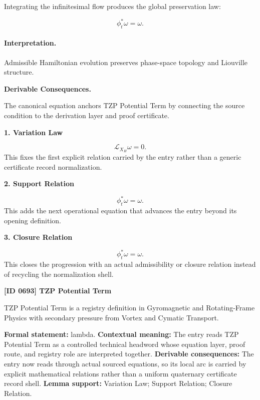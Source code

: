 Integrating the infinitesimal flow produces the global preservation law:

\begin{equation}
\boxed{
\phi_t^{*}\omega=\omega.
}
\end{equation}

\paragraph{Interpretation.}
Admissible Hamiltonian evolution preserves phase-space topology and Liouville structure.

\par\vspace{0.35em}
\noindent\textbf{Derivable Consequences.}\quad
\begingroup
\footnotesize
\raggedright
The canonical equation anchors TZP Potential Term by connecting the source condition to the derivation layer and proof certificate.
\par\endgroup

\noindent\textbf{1. Variation Law}\par
\[
\mathcal{L}_{X_H}\omega=0.
\]
\noindent This fixes the first explicit relation carried by the entry rather than a generic certificate record normalization.\par
\noindent\textbf{2. Support Relation}\par
\[
\phi_t^{*}\omega=\omega.
\]
\noindent This adds the next operational equation that advances the entry beyond its opening definition.\par
\noindent\textbf{3. Closure Relation}\par
\[
\boxed{ \phi_t^{*}\omega=\omega. }
\]
\noindent This closes the progression with an actual admissibility or closure relation instead of recycling the normalization shell.\par

\clearpage
\noindent\textbf{[ID 0693] TZP Potential Term}\par
\vspace{0.35em}
\begingroup\small
{}
TZP Potential Term is a registry definition in Gyromagnetic and Rotating-Frame Physics with secondary pressure from Vortex and Cymatic Transport.

\begingroup\footnotesize\setlength{\emergencystretch}{3em}\sloppy
\textbf{Formal statement:} lambda. \textbf{Contextual meaning:} The entry reads TZP Potential Term as a controlled technical headword whose equation layer, proof route, and registry role are interpreted together. \textbf{Derivable consequences:} The entry now reads through actual sourced equations, so its local arc is carried by explicit mathematical relations rather than a uniform quaternary certificate record shell. \textbf{Lemma support:} Variation Law; Support Relation; Closure Relation.\par
\endgroup

